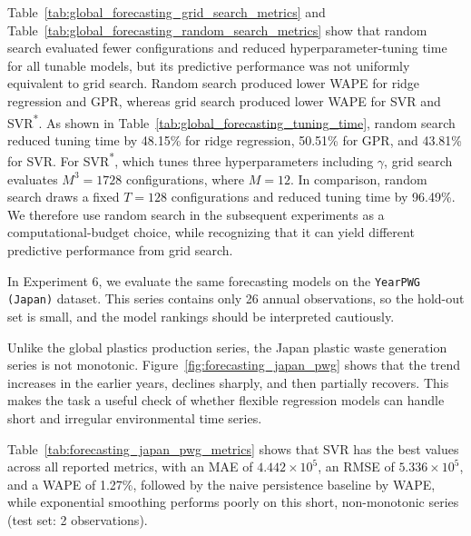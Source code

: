 Table~\ref{tab:global_forecasting_grid_search_metrics} and Table~\ref{tab:global_forecasting_random_search_metrics} show that random search evaluated fewer configurations and reduced hyperparameter-tuning time for all tunable models, but its predictive performance was not uniformly equivalent to grid search. Random search produced lower WAPE for ridge regression and GPR, whereas grid search produced lower WAPE for SVR and SVR\textsuperscript{*}. As shown in Table~\ref{tab:global_forecasting_tuning_time}, random search reduced tuning time by 48.15\% for ridge regression, 50.51\% for GPR, and 43.81\% for SVR. For SVR\textsuperscript{*}, which tunes three hyperparameters including \(\gamma\), grid search evaluates \(M^3 = 1728\) configurations, where \(M = 12\). In comparison, random search draws a fixed \(T = 128\) configurations and reduced tuning time by 96.49\%. We therefore use random search in the subsequent experiments as a computational-budget choice, while recognizing that it can yield different predictive performance from grid search.


In Experiment 6, we evaluate the same forecasting models on the \texttt{YearPWG (Japan)} dataset. This series contains only 26 annual observations, so the hold-out set is small, and the model rankings should be interpreted cautiously.




Unlike the global plastics production series, the Japan plastic waste generation series is not monotonic. Figure~\ref{fig:forecasting_japan_pwg} shows that the trend increases in the earlier years, declines sharply, and then partially recovers. This makes the task a useful check of whether flexible regression models can handle short and irregular environmental time series.

Table~\ref{tab:forecasting_japan_pwg_metrics} shows that SVR has the best values across all reported metrics, with an MAE of \(4.442 \times 10^5\), an RMSE of \(5.336 \times 10^5\), and a WAPE of 1.27\%, followed by the naive persistence baseline by WAPE, while exponential smoothing performs poorly on this short, non-monotonic series (test set: 2 observations).

